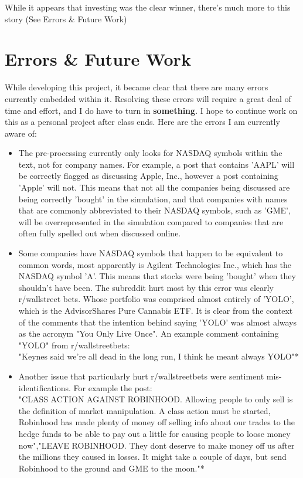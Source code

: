 \documentclass[11pt]{article}
\begin{document}
    While it appears that investing was the clear winner, there's much more to
    this story (See Errors \& Future Work)
\section{Errors \& Future Work}
    While developing this project, it became clear that there are many errors
    currently embedded within it. Resolving these errors will require a great
    deal of time and effort, and I do have to turn in \textbf{something}. I
    hope to continue work on this as a personal project after class ends. Here
    are the errors I am currently aware of:
    \begin{itemize}
	\item The pre-processing currently only looks for NASDAQ symbols
	    within the text, not for company names. For example, a post that
	    contains 'AAPL' will be correctly flagged as discussing Apple, Inc.,
	    however a post containing 'Apple' will not. This means that not all
	    the companies being discussed are being correctly 'bought' in the
	    simulation, and that companies with names that are commonly
	    abbreviated to their NASDAQ symbols, such as 'GME', will be
	    overrepresented in the simulation compared to companies that are
	    often fully spelled out when discussed online.
	\item Some companies have NASDAQ symbols that happen to be equivalent
	    to common words, most apparently is Agilent Technologies Inc.,
	    which has the NASDAQ symbol 'A'. This means that stocks were being
	    'bought' when they shouldn't have been. The subreddit hurt most by
	    this error was clearly r/wallstreet bets. Whose portfolio was
	    comprised almost entirely of 'YOLO', which is the AdvisorShares
	    Pure Cannabis ETF. It is clear from the context of the comments
	    that the intention behind saying 'YOLO' was almost always
	    as the acronym "You Only Live Once". An example comment containing
	    "YOLO" from r/wallstreetbets:\\

	    "Keynes said we're all dead in the long run, I think he meant
	    always YOLO"*
	\item Another issue that particularly hurt r/wallstreetbets were
	    sentiment mis-identifications. For example the post:\\

	    "CLASS ACTION AGAINST ROBINHOOD. Allowing people to only sell is
	    the definition of market manipulation. A class action must be
	    started, Robinhood has made plenty of money off selling info about
	    our trades to the hedge funds to be able to pay out a little for
	    causing people to loose money now","LEAVE ROBINHOOD. They dont
	    deserve to make money off us after the millions they caused in
	    losses. It might take a couple of days, but send Robinhood to the
	    ground and GME to the moon."*\\


\end{itemize}
\end{document}

